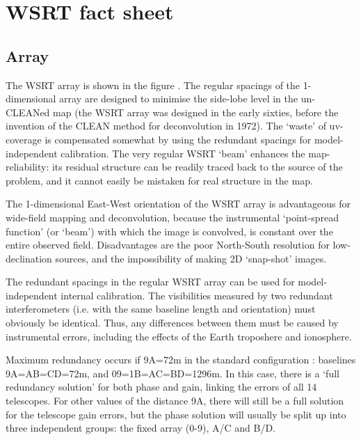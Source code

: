 
\chapter{ WSRT fact sheet} 


\section{Array} 

	The WSRT array is shown in the figure .  The
regular spacings of the 1-dimensional array are designed to minimise the
side-lobe level in the un-CLEANed map (the WSRT array was designed in the early
sixties, before the invention of the CLEAN method for deconvolution in 1972).
The `waste' of uv-coverage is compensated somewhat by using the redundant
spacings for model-independent calibration.  The very regular WSRT `beam'
enhances the map-reliability: its residual structure can be readily traced back
to the source of the problem, and it cannot easily be mistaken for real
structure in the map. 

	The 1-dimensional East-West orientation of the WSRT array is
advantageous for wide-field mapping and deconvolution, because the instrumental
`point-spread function' (or `beam') with which the image is convolved, is
constant over the entire observed field.  Disadvantages are the poor
North-South resolution for low-declination sources, and the impossibility of
making 2D `snap-shot' images. 

 


	The redundant spacings in the regular WSRT array can be used for
model-independent internal calibration.  The visibilities measured by two
redundant interferometers (i.e.  with the same baseline length and orientation)
must obviously be identical.  Thus, any differences between them must be caused
by instrumental errors, including the effects of the Earth troposhere and
ionosphere. 

	Maximum redundancy occurs if 9A=72m in the standard configuration
: baselines 9A=AB=CD=72m, and 09=1B=AC=BD=1296m.  In this
case, there is a `full redundancy solution' for both phase and gain, linking
the errors of all 14 telescopes.  For other values of the distance 9A, there
will still be a full solution for the telescope gain errors, but the phase
solution will usually be split up into three independent groups: the fixed
array (0-9), A/C and B/D. 



